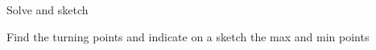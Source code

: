 \documentclass[12pt, a4paper, addpoints]{exam}
\newcommand{\ts}{\vspace{22 mm}}
\newcommand{\ms}{\vspace{33 mm}}
\newcommand{\bs}{\vspace{44mm}}
\newcommand{\cubicwithtps}[3]{
    \pgfmathtruncatemacro{\a}{3*#1}  %
    \pgfmathtruncatemacro{\b}{6*#2}  %

    $y = 2x^3 
    \ifnum\a>0 + \a x^2 \else \a x^2 \fi 
    \ifnum\b>0 + \b x \else \b x \fi 
    \ifnum#3>0 + #3 \else #3 \fi$
}
\begin{document}
\begin{questions}
\question Solve and sketch 

\begin{multicols}{3}
\end{multicols}
\ts




\question Find the turning points and indicate on a sketch the max and min points

\begin{multicols}{2}
\end{multicols}
\bs


\end{questions}
\end{document}
